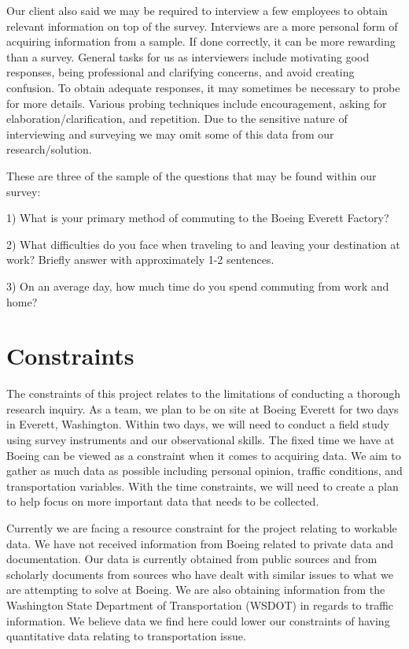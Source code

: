 \documentclass[onecolumn, draftclsnofoot,10pt, compsoc]{IEEEtran}
\begin{document}
Our client also said we may be required to interview a few employees to obtain relevant information on top of the survey. 
Interviews are a more personal form of acquiring information from a sample. 
If done correctly, it can be more rewarding than a survey. 
General tasks for us as interviewers include motivating good responses, being professional and clarifying concerns, and avoid creating confusion. 
To obtain adequate responses, it may sometimes be necessary to probe for more details. 
Various probing techniques include encouragement, asking for elaboration/clarification, and repetition. 
Due to the sensitive nature of interviewing and surveying we may omit some of this data from our research/solution.
\par\null\par
\noindent These are three of the sample of the questions that may be found within our survey:

1) What is your primary method of commuting to the Boeing Everett Factory?

2) What difficulties do you face when traveling to and leaving your destination at work? 
Briefly answer with \indent approximately 1-2 sentences. 

3) On an average day, how much time do you spend commuting from work and home?

\section{Constraints}
\indent \indent The constraints of this project relates to the limitations of conducting a thorough research inquiry. 
As a team, we plan to be on site at Boeing Everett for two days in Everett, Washington. 
Within two days, we will need to conduct a field study using survey instruments and our observational skills. 
The fixed time we have at Boeing can be viewed as a constraint when it comes to acquiring data. We aim to gather as much data as possible including personal opinion, traffic conditions, and transportation variables. 
With the time constraints, we will need to create a plan to help focus on more important data that needs to be collected.


Currently we are facing a resource constraint for the project relating to workable data. 
We have not received information from Boeing related to private data and documentation. 
Our data is currently obtained from public sources and from scholarly documents from sources who have dealt with similar issues to what we are attempting to solve at Boeing. 
We are also obtaining information from the Washington State Department of Transportation (WSDOT) in regards to traffic information. 
We believe data we find here could lower our constraints of having quantitative data relating to transportation issue. 
\end{document}
